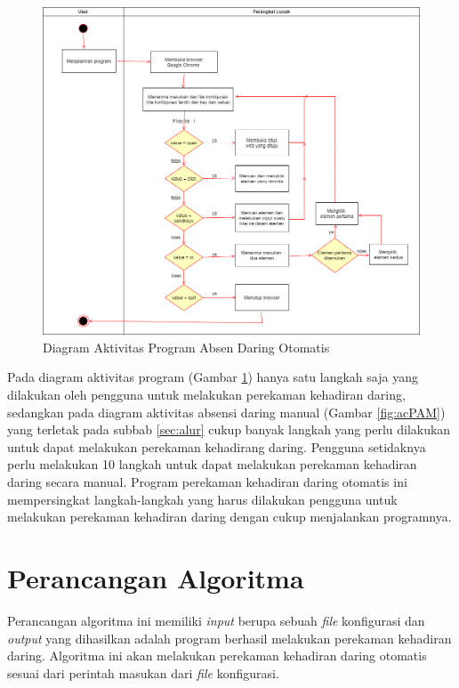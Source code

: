 \begin{figure}[H]
	\centering
	\includegraphics[scale=0.45]{Gambar/ActivityAplikasi.png}
	\caption{Diagram Aktivitas Program Absen Daring Otomatis} 
	\label{fig:ActivityAplikasi}
\end{figure}
\vspace{-0.3cm}
Pada diagram aktivitas program (Gambar \ref{fig:ActivityAplikasi}) hanya satu langkah saja yang dilakukan oleh pengguna untuk melakukan perekaman kehadiran daring, sedangkan pada diagram aktivitas absensi daring manual (Gambar \ref{fig:acPAM}) yang terletak pada subbab \ref{sec:alur} cukup banyak langkah yang perlu dilakukan untuk dapat melakukan perekaman kehadirang daring. Pengguna setidaknya perlu melakukan 10 langkah untuk dapat melakukan perekaman kehadiran daring secara manual. Program perekaman kehadiran daring otomatis ini mempersingkat langkah-langkah yang harus dilakukan pengguna untuk melakukan perekaman kehadiran daring dengan cukup menjalankan programnya.
\vspace{-0.4cm}
\section{Perancangan Algoritma} 
Perancangan algoritma ini memiliki \textit{input} berupa sebuah \textit{file} konfigurasi dan \textit{output} yang dihasilkan adalah program berhasil melakukan perekaman kehadiran daring. Algoritma ini akan melakukan perekaman kehadiran daring otomatis sesuai dari perintah masukan dari \textit{file} konfigurasi. 


